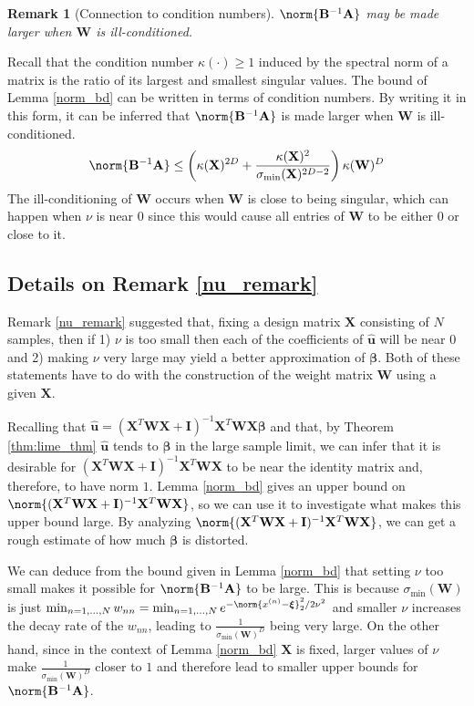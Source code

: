 \documentclass[mnsc,blindrev]{informs3}
\newcommand{\bu}{\mathbf{u}}
\newcommand{\bA}{\mathbf{A}}
\newcommand{\bB}{\mathbf{B}}
\newcommand{\bX}{\mathbf{X}}
\newcommand{\bI}{\mathbf{I}}
\newcommand{\bW}{\mathbf{W}}
\newcommand{\bxi}{\boldsymbol{\xi}}
\newtheorem{remark2}[thm]{Remark}
\begin{document}
\begin{remark2}[Connection to condition numbers]
    \label{condition_number_remark}
    $\norm{\bB^{-1}\bA}$ may be made larger when $\bW$ is ill-conditioned.
\end{remark2}
        Recall that the condition number $\kappa(\cdot)\geq 1$ induced by the spectral norm of a matrix is the ratio of its largest and smallest singular values. The bound of Lemma \ref{norm_bd} can be written in terms of condition numbers. By writing it in this form, it can be inferred that $\norm{\bB^{-1}\bA}$ is made larger when $\bW$ is ill-conditioned. 
    \begin{equation*}
        \norm{\bB^{-1}\bA} \leq \left(\kappa(\bX)^{2D} + \frac{\kappa(\bX)^2}{\sigma_{\min}(\bX)^{2D-2}}\right) \kappa(\bW)^D 
    \end{equation*}
    The ill-conditioning of $\bW$ occurs when $\bW$ is close to being singular, which can happen when $\nu$ is near $0$ since this would cause all entries of $\bW$ to be either 0 or close to it. 


    \subsection{Details on Remark \ref{nu_remark}}
                Remark \ref{nu_remark} suggested that, fixing a design matrix $\bX$ consisting of $N$ samples, then if 1) $\nu$ is too small then each of the coefficients of $\hat{\bu}$ will be near $0$ and 2) making $\nu$ very large may yield a better  approximation of $\boldsymbol{\beta}$. Both of these statements have to do with the construction of the weight matrix $\bW$ using a given $\bX$. 

                Recalling that $\hat{\bu}=(\bX^T \bW \bX+\bI)^{-1}\bX^T \bW \bX \boldsymbol{\beta}$ and that, by Theorem \ref{thm:lime_thm} $\hat{\bu}$ tends to $\boldsymbol{\beta}$ in the large sample limit, we can infer that it is desirable for $(\bX^T \bW \bX+\bI)^{-1}\bX^T \bW \bX$ to be near the identity matrix and, therefore, to have norm $1$. Lemma \ref{norm_bd} gives an upper bound on $\norm{(\bX^T \bW \bX+\bI)^{-1}\bX^T \bW \bX}$, so we can use it to investigate what makes this upper bound large. By analyzing $\norm{(\bX^T \bW \bX+\bI)^{-1}\bX^T \bW \bX}$, we can get a rough estimate of how much $\boldsymbol{\beta}$ is distorted. %
                
                We can deduce from the bound given in Lemma \ref{norm_bd} that setting $\nu$ too small makes it possible for $\norm{\bB^{-1}\bA}$ to be large. This is because $\sigma_{\min}(\bW)$ is just $\min_{n=1,\ldots,N} w_{nn}=\min_{n=1,\ldots,N} e^{-\norm{x^{(n)}-\bxi}_2^2/2\nu^2}$ and smaller $\nu$ increases the decay rate of the $w_{nn}$, leading to $\frac{1}{\sigma_{\min}(\bW)^D}$ being very large. On the other hand, since in the context of Lemma \ref{norm_bd} $\bX$ is fixed, larger values of $\nu$ make $\frac{1}{\sigma_{\min}(\bW)^D}$ closer to $1$ and therefore lead to smaller upper bounds for $\norm{\bB^{-1}\bA}$.
\end{document}
